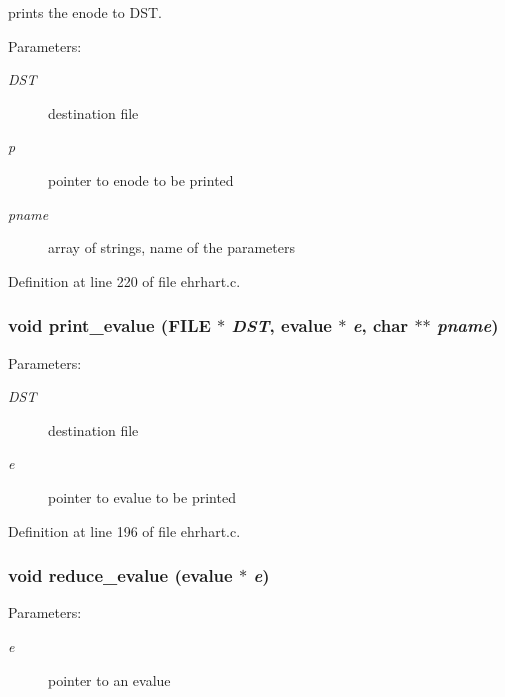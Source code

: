 prints the enode to DST.

\begin{Desc}
\item[Parameters: ]\par
\begin{description}
\item[{\em 
DST}]destination file  \item[{\em 
p}]pointer to enode to be printed  \item[{\em 
pname}]array of strings, name of the parameters \end{description}
\end{Desc}


Definition at line 220 of file ehrhart.c.
\subsubsection{\setlength{\rightskip}{0pt plus 5cm}void print\_\-evalue (FILE $\ast$ {\em DST}, evalue $\ast$ {\em e}, char $\ast$$\ast$ {\em pname})}\label{ehrhart_8c_a10}


\begin{Desc}
\item[Parameters: ]\par
\begin{description}
\item[{\em 
DST}]destination file \item[{\em 
e}]pointer to evalue to be printed \end{description}
\end{Desc}


Definition at line 196 of file ehrhart.c.
\subsubsection{\setlength{\rightskip}{0pt plus 5cm}void reduce\_\-evalue (evalue $\ast$ {\em e})\hspace{0.3cm}{\tt  [static]}}\label{ehrhart_8c_a13}


\begin{Desc}
\item[Parameters: ]\par
\begin{description}
\item[{\em 
e}]pointer to an evalue \end{description}
\end{Desc}


